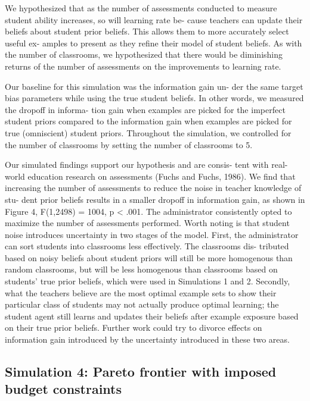 \documentclass[10pt, letterpaper]{article}
\begin{document}
We hypothesized that as the number of assessments conducted to measure
student ability increases, so will learning rate be- cause teachers can
update their beliefs about student prior beliefs. This allows them to
more accurately select useful ex- amples to present as they refine their
model of student beliefs. As with the number of classrooms, we
hypothesized that there would be diminishing returns of the number of
assessments on the improvements to learning rate.

Our baseline for this simulation was the information gain un- der the
same target bias parameters while using the true student beliefs. In
other words, we measured the dropoff in informa- tion gain when examples
are picked for the imperfect student priors compared to the information
gain when examples are picked for true (omniscient) student priors.
Throughout the simulation, we controlled for the number of classrooms by
setting the number of classrooms to 5.

Our simulated findings support our hypothesis and are consis- tent with
real-world education research on assessments (Fuchs and Fuchs, 1986). We
find that increasing the number of assessments to reduce the noise in
teacher knowledge of stu- dent prior beliefs results in a smaller
dropoff in information gain, as shown in Figure 4, F(1,2498) = 1004, p
\textless{} .001. The administrator consistently opted to maximize the
number of assessments performed. Worth noting is that student noise
introduces uncertainty in two stages of the model. First, the
administrator can sort students into classrooms less effectively. The
classrooms dis- tributed based on noisy beliefs about student priors
will still be more homogenous than random classrooms, but will be less
homogenous than classrooms based on students' true prior beliefs, which
were used in Simulations 1 and 2. Secondly, what the teachers believe
are the most optimal example sets to show their particular class of
students may not actually produce optimal learning; the student agent
still learns and updates their beliefs after example exposure based on
their true prior beliefs. Further work could try to divorce effects on
information gain introduced by the uncertainty introduced in these two
areas.

\subsection{Simulation 4: Pareto frontier with imposed budget
constraints}\label{simulation-4-pareto-frontier-with-imposed-budget-constraints}
\end{document}
